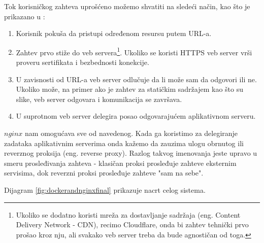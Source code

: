 \documentclass[12pt,oneside]{memoir}
\begin{document}
Tok korisničkog zahteva uprošćeno možemo shvatiti na sledeći način, kao što je prikazano u \cite{webvsappserver}:
\begin{enumerate}
    \item Korisnik pokuša da pristupi određenom resursu putem URL-a.
    \item Zahtev prvo stiže do veb servera\footnote{Ukoliko se dodatno koristi mreža za dostavljanje sadržaja (eng. Content Delivery Network - CDN), recimo Cloudflare, onda bi zahtev tehnički prvo prošao kroz nju, ali svakako veb server treba da bude agnostičan od toga.}. Ukoliko se koristi HTTPS veb server vrši proveru sertifikata i bezbednosti konekcije.
    \item U zavisnosti od URL-a veb server odlučuje da li može sam da odgovori ili ne. Ukoliko može, na primer ako je zahtev za statičkim sadržajem kao što su slike, veb server odgovara i komunikacija se završava.
    \item U suprotnom veb server delegira posao odgovarajućem aplikativnom serveru.
\end{enumerate}

$nginx$ \cite{nginxdocs} nam omogućava sve od navedenog. Kada ga koristimo za delegiranje zadataka aplikativnim serverima onda kažemo da zauzima ulogu obrnutog ili reverznog proksija (eng. reverse proxy). Razlog takvog imenovanja jeste upravo u smeru prosleđivanja zahteva - klasičan proksi prosleđuje zahteve eksternim servisima, dok reverzni proksi prosleđuje zahteve "sam na sebe". 

Dijagram \ref{fig:dockerandnginxfinal} prikazuje nacrt celog sistema.
\end{document}
